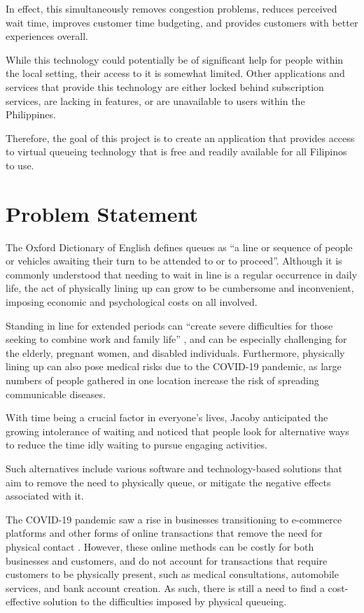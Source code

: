 In effect, this simultaneously removes congestion problems, reduces perceived wait time, improves customer time budgeting, and provides customers with better experiences overall. 

While this technology could potentially be of significant help for people within the local setting, their access to it is somewhat limited. Other applications and services that provide this technology are either locked behind subscription services, are lacking in features, or are unavailable to users within the Philippines.

Therefore, the goal of this project is to create an application that provides access to virtual queueing technology that is free and readily available for all Filipinos to use.


\section{Problem Statement}

The Oxford Dictionary of English \citeyear{OxfordDictionary2022} defines queues as “a line or sequence of people or vehicles awaiting their turn to be attended to or to proceed”. Although it is commonly understood that needing to wait in line is a regular occurrence in daily life, the act of physically lining up can grow to be cumbersome and inconvenient, imposing economic and psychological costs on all involved.

Standing in line for extended periods can “create severe difficulties for those seeking to combine work and family life” \cite{Bittman2000}, and can be especially challenging for the elderly, pregnant women, and disabled individuals. Furthermore, physically lining up can also pose medical risks due to the COVID-19 pandemic, as large numbers of people gathered in one location increase the risk of spreading communicable diseases.

With time being a crucial factor in everyone's lives, Jacoby \citeyear{Jacoby1974} anticipated the growing intolerance of waiting and noticed that people look for alternative ways to reduce the time idly waiting to pursue engaging activities. 

Such alternatives include various software and technology-based solutions that aim to remove the need to physically queue, or mitigate the negative effects associated with it. 

The COVID-19 pandemic saw a rise in businesses transitioning to e-commerce platforms and other forms of online transactions that remove the need for physical contact \cite{alfonso2021commerce}. However, these online methods can be costly for both businesses and customers, and do not account for transactions that require customers to be physically present, such as medical consultations, automobile services, and bank account creation. As such, there is still a need to find a cost-effective solution to the difficulties imposed by physical queueing.

